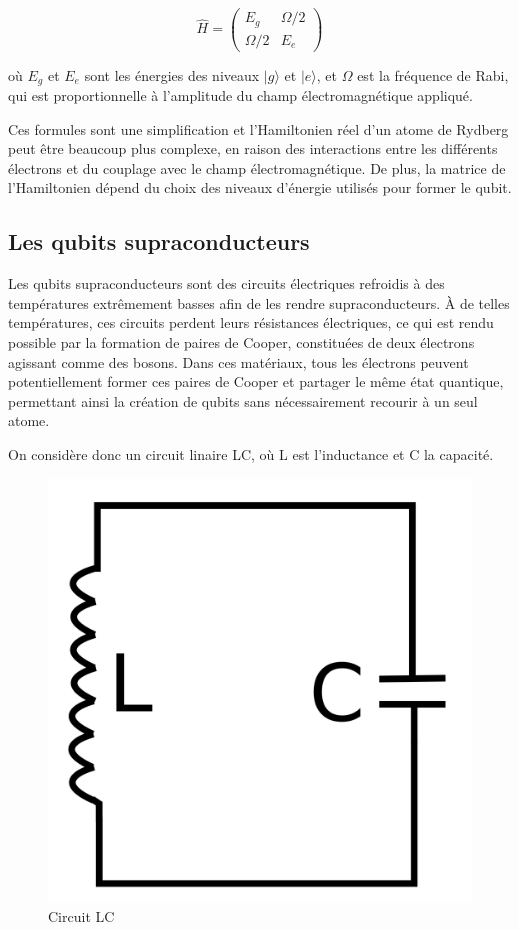 \documentclass{article}
\begin{document}
\begin{multicols}{2}
$$
\hat{H} = \begin{pmatrix}
E_g & \Omega/2 \\
\Omega/2 & E_e
\end{pmatrix}
$$

où $E_g$ et $E_e$ sont les énergies des niveaux $|g\rangle$ et $|e\rangle$, et $\Omega$ est la fréquence de Rabi, qui est proportionnelle à l'amplitude du champ électromagnétique appliqué.

Ces formules sont une simplification et l'Hamiltonien réel d'un atome de Rydberg peut être beaucoup plus complexe, en raison des interactions entre les différents électrons et du couplage avec le champ électromagnétique. De plus, la matrice de l'Hamiltonien dépend du choix des niveaux d'énergie utilisés pour former le qubit.


\subsection{Les qubits supraconducteurs}
Les qubits supraconducteurs sont des circuits électriques refroidis à des températures extrêmement basses afin de les rendre supraconducteurs. 
À de telles températures, ces circuits perdent leurs résistances électriques, ce qui est rendu possible par la formation de paires de Cooper, constituées de deux électrons agissant comme des bosons. 
Dans ces matériaux, tous les électrons peuvent potentiellement former ces paires de Cooper et partager le même état quantique, permettant ainsi la création de qubits sans nécessairement recourir à un seul atome.


On considère donc un circuit linaire LC, où L est l'inductance et C la capacité. 

\begin{figure}[H]
    \centering
    \includegraphics[width = 0.7\columnwidth]{fig/circuit_LC.png}
    \caption{Circuit LC}
    \label{fig:Circuit_LC}
\end{figure}




\end{multicols}
\end{document}
